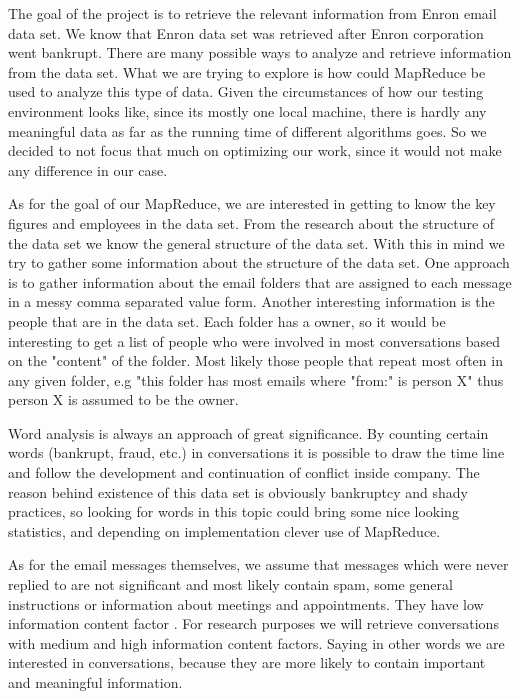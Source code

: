 \documentclass{llncs}
\begin{document}
The goal of the project is to retrieve the relevant information from Enron email data set. We know that Enron data set was retrieved after Enron corporation went bankrupt. There are many possible ways to analyze and retrieve information from the data set. What we are trying to explore is how could MapReduce be used to analyze this type of data. Given the circumstances of how our testing environment looks like, since its mostly one local machine, there is hardly any meaningful data as far as the running time of different algorithms goes. So we decided to not focus that much on optimizing our work, since it would not make any difference in our case.

As for the goal of our MapReduce, we are interested in getting to know the key figures and employees in the data set. From the research about the structure of the data set \cite{Enron mining} we know the general structure of the data set. With this in mind we try to gather some information about the structure of the data set. One approach is to gather information about the email folders that are assigned to each message in a messy comma separated value form. Another interesting information is the people that are in the data set. Each folder has a owner, so it would be interesting to get a list of people who were involved in most conversations based on the "content" of the folder. Most likely those people that repeat most often in any given folder, e.g "this folder has most emails where "from:" is person X" thus person X is assumed to be the owner.

Word analysis is always an approach of great significance. By counting certain words (bankrupt, fraud, etc.) in conversations it is possible to draw the time line and follow the development and continuation of conflict inside company. The reason behind existence of this data set is obviously bankruptcy and shady practices, so looking for words in this topic could bring some nice looking statistics, and depending on implementation clever use of MapReduce.

As for the email messages themselves, we assume that messages which were never replied to are not significant and most likely contain spam, some general instructions or information about meetings and appointments. They have low information content factor \cite{Enron mining}. For research purposes we will retrieve conversations with medium and high information content factors. Saying in other words we are interested in conversations, because they are more likely to contain important and meaningful information.
\end{document}
